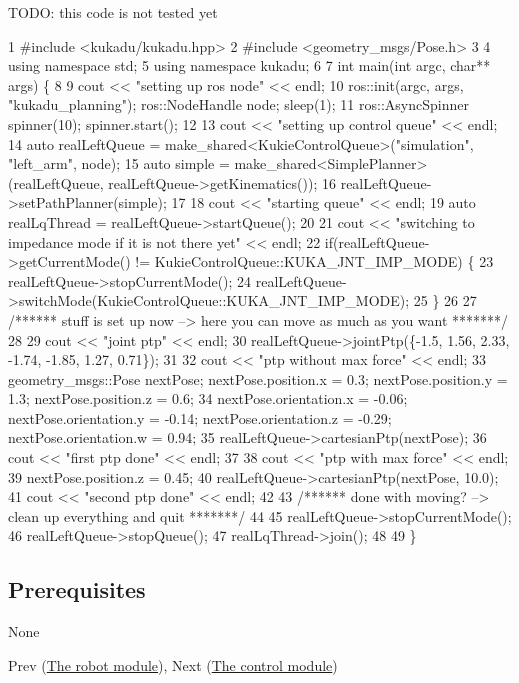 T\-O\-D\-O\-: this code is not tested yet


\begin{DoxyCodeInclude}
1 \textcolor{preprocessor}{#include <kukadu/kukadu.hpp>}
2 \textcolor{preprocessor}{#include <geometry\_msgs/Pose.h>}
3 
4 \textcolor{keyword}{using namespace }std;
5 \textcolor{keyword}{using namespace }kukadu;
6 
7 \textcolor{keywordtype}{int} main(\textcolor{keywordtype}{int} argc, \textcolor{keywordtype}{char}** args) \{
8 
9     cout << \textcolor{stringliteral}{"setting up ros node"} << endl;
10     ros::init(argc, args, \textcolor{stringliteral}{"kukadu\_planning"}); ros::NodeHandle node; sleep(1);
11     ros::AsyncSpinner spinner(10); spinner.start();
12 
13     cout << \textcolor{stringliteral}{"setting up control queue"} << endl;
14     \textcolor{keyword}{auto} realLeftQueue = make\_shared<KukieControlQueue>(\textcolor{stringliteral}{"simulation"}, \textcolor{stringliteral}{"left\_arm"}, node);
15     \textcolor{keyword}{auto} simple = make\_shared<SimplePlanner>(realLeftQueue, realLeftQueue->getKinematics());
16     realLeftQueue->setPathPlanner(simple);
17 
18     cout << \textcolor{stringliteral}{"starting queue"} << endl;
19     \textcolor{keyword}{auto} realLqThread = realLeftQueue->startQueue();
20 
21     cout << \textcolor{stringliteral}{"switching to impedance mode if it is not there yet"} << endl;
22     \textcolor{keywordflow}{if}(realLeftQueue->getCurrentMode() != KukieControlQueue::KUKA\_JNT\_IMP\_MODE) \{
23         realLeftQueue->stopCurrentMode();
24         realLeftQueue->switchMode(KukieControlQueue::KUKA\_JNT\_IMP\_MODE);
25     \}
26 
27     \textcolor{comment}{/****** stuff is set up now --> here you can move as much as you want *******/}
28 
29     cout << \textcolor{stringliteral}{"joint ptp"} << endl;
30     realLeftQueue->jointPtp(\{-1.5, 1.56, 2.33, -1.74, -1.85, 1.27, 0.71\});
31 
32     cout << \textcolor{stringliteral}{"ptp without max force"} << endl;
33     geometry\_msgs::Pose nextPose; nextPose.position.x = 0.3; nextPose.position.y = 1.3; nextPose.position.z
       = 0.6;
34     nextPose.orientation.x = -0.06; nextPose.orientation.y = -0.14; nextPose.orientation.z = -0.29; 
      nextPose.orientation.w = 0.94;
35     realLeftQueue->cartesianPtp(nextPose);
36     cout << \textcolor{stringliteral}{"first ptp done"} << endl;
37 
38     cout << \textcolor{stringliteral}{"ptp with max force"} << endl;
39     nextPose.position.z = 0.45;
40     realLeftQueue->cartesianPtp(nextPose, 10.0);
41     cout << \textcolor{stringliteral}{"second ptp done"} << endl;
42 
43     \textcolor{comment}{/****** done with moving? --> clean up everything and quit *******/}
44 
45     realLeftQueue->stopCurrentMode();
46     realLeftQueue->stopQueue();
47     realLqThread->join();
48 
49 \}
\end{DoxyCodeInclude}


\subsection*{Prerequisites}

None

Prev (\hyperlink{robotpage}{The robot module}), Next (\hyperlink{controlpage}{The control module}) 